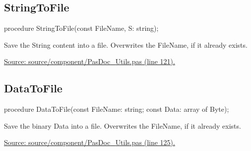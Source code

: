 \documentclass{report}
\newif\ifpdf
\begin{document}
\subsection*{StringToFile}
\fi
\label{PasDoc_Utils-StringToFile}
\begin{list}{}{
\setlength{\itemindent}{0cm}
\setlength{\listparindent}{0cm}
\setlength{\leftmargin}{\evensidemargin}
\addtolength{\leftmargin}{\tmplength}
\settowidth{\labelsep}{X}
\addtolength{\leftmargin}{\labelsep}
\setlength{\labelwidth}{\tmplength}
}
\item[\textbf{Declaration}\hfill]
\ifpdf
\begin{flushleft}
\fi
\begin{ttfamily}
procedure StringToFile(const FileName, S: string);\end{ttfamily}

\ifpdf
\end{flushleft}
\fi

\par
\item[\textbf{Description}]
Save the String content into a file. Overwrites the FileName, if it already exists.\par
\href{https://github.com/pasdoc/pasdoc/blob/master/source/component/PasDoc_Utils.pas#L121}{Source: source/component/PasDoc{\_}Utils.pas (line 121).}

\end{list}
\ifpdf
\subsection*{\large{\textbf{DataToFile}}\normalsize\hspace{1ex}\hrulefill}
\else
\subsection*{DataToFile}
\fi
\label{PasDoc_Utils-DataToFile}
\begin{list}{}{
\setlength{\itemindent}{0cm}
\setlength{\listparindent}{0cm}
\setlength{\leftmargin}{\evensidemargin}
\addtolength{\leftmargin}{\tmplength}
\settowidth{\labelsep}{X}
\addtolength{\leftmargin}{\labelsep}
\setlength{\labelwidth}{\tmplength}
}
\item[\textbf{Declaration}\hfill]
\ifpdf
\begin{flushleft}
\fi
\begin{ttfamily}
procedure DataToFile(const FileName: string; const Data: array of Byte);\end{ttfamily}

\ifpdf
\end{flushleft}
\fi

\par
\item[\textbf{Description}]
Save the binary Data into a file. Overwrites the FileName, if it already exists.\par
\href{https://github.com/pasdoc/pasdoc/blob/master/source/component/PasDoc_Utils.pas#L125}{Source: source/component/PasDoc{\_}Utils.pas (line 125).}

\end{list}
\ifpdf
\end{document}
